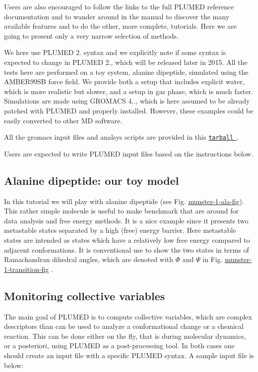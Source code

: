 Users are also encouraged to follow the links to the full P\+L\+U\+M\+E\+D reference documentation and to wander around in the manual to discover the many available features and to do the other, more complete, tutorials. Here we are going to present only a very narrow selection of methods.

We here use P\+L\+U\+M\+E\+D 2. syntax and we explicitly note if some syntax is expected to change in P\+L\+U\+M\+E\+D 2., which will be released later in 2015. All the tests here are performed on a toy system, alanine dipeptide, simulated using the A\+M\+B\+E\+R99\+S\+B force field. We provide both a setup that includes explicit water, which is more realistic but slower, and a setup in gas phase, which is much faster. Simulations are made using G\+R\+O\+M\+A\+C\+S 4.., which is here assumed to be already patched with P\+L\+U\+M\+E\+D and properly installed. However, these examples could be easily converted to other M\+D software.

All the gromacs input files and analsys scripts are provided in this \href{tutorial-resources/munster.tar.gz}{\tt tarball }.

Users are expected to write P\+L\+U\+M\+E\+D input files based on the instructions below.\hypertarget{munster_munster-toymodel}{}\subsection{Alanine dipeptide\+: our toy model}\label{munster_munster-toymodel}
In this tutorial we will play with alanine dipeptide (see Fig. \hyperlink{munster_munster-1-ala-fig}{munster-\/1-\/ala-\/fig}). This rather simple molecule is useful to make benchmark that are around for data analysis and free energy methods. It is a nice example since it presents two metastable states separated by a high (free) energy barrier. Here metastable states are intended as states which have a relatively low free energy compared to adjacent conformations. It is conventional use to show the two states in terms of Ramachandran dihedral angles, which are denoted with $ \Phi $ and $ \Psi $ in Fig. \hyperlink{munster_munster-1-transition-fig}{munster-\/1-\/transition-\/fig} .

\label{munster_munster-1-ala-fig}%
\hypertarget{munster_munster-1-ala-fig}{}%
 \label{munster_munster-1-transition-fig}%
\hypertarget{munster_munster-1-transition-fig}{}%
 \hypertarget{munster_munster-monitor}{}\subsection{Monitoring collective variables}\label{munster_munster-monitor}
The main goal of P\+L\+U\+M\+E\+D is to compute collective variables, which are complex descriptors than can be used to analyze a conformational change or a chemical reaction. This can be done either on the fly, that is during molecular dynamics, or a posteriori, using P\+L\+U\+M\+E\+D as a post-\/processing tool. In both cases one should create an input file with a specific P\+L\+U\+M\+E\+D syntax. A sample input file is below\+:

